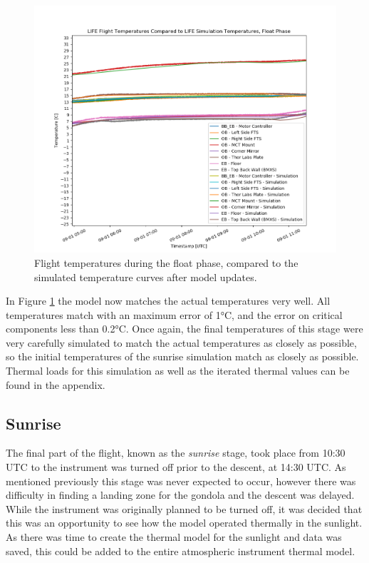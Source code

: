 \begin{figure}
    \centering
    \includegraphics[width=\textwidth]{chap4_images/float_images/float_with_sim_temps.png}
    \caption{Flight temperatures during the float phase, compared to the simulated temperature curves after model updates.}
    \label{fig:float_temps_with_sims}
\end{figure}

In Figure \ref{fig:float_temps_with_sims} the model now matches the actual temperatures very well. All temperatures match with an maximum error of 1°C, and the error on critical components less than 0.2°C. Once again, the final temperatures of this stage were very carefully simulated to match the actual temperatures as closely as possible, so the initial temperatures of the sunrise simulation match as closely as possible. Thermal loads for this simulation as well as the iterated thermal values can be found in the appendix.

\subsection{Sunrise}
The final part of the flight, known as the \textit{sunrise} stage, took place from 10:30 UTC to the instrument was turned off prior to the descent, at 14:30 UTC. As mentioned previously this stage was never expected to occur, however there was difficulty in finding a landing zone for the gondola and the descent was delayed. While the instrument was originally planned to be turned off, it was decided that this was an opportunity to see how the model operated thermally in the sunlight. As there was time to create the thermal model for the sunlight and data was saved, this could be added to the entire atmospheric instrument thermal model.


